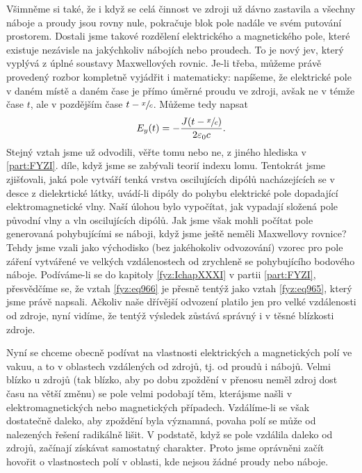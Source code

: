     Všimněme si také, že i když se celá činnost ve zdroji už dávno zastavila a všechny náboje a
    proudy jsou rovny nule, pokračuje blok pole nadále ve svém putování prostorem. Dostali jsme
    takové rozdělení elektrického a magnetického pole, které existuje nezávisle na jakýchkoliv
    nábojích nebo proudech. To je nový jev, který vyplývá z úplné soustavy Maxwellových rovnic.
    Je-li třeba, můžeme právě provedený rozbor kompletně vyjádřit i matematicky: napíšeme, že
    elektrické pole v daném místě a daném čase je přímo úměrné proudu ve zdroji, avšak ne v témže
    čase \(t\), ale v pozdějším čase \(t-\sfrac{x}{c}\). Můžeme tedy napsat
    \begin{equation}\label{fyz:eq965}
      E_y(t)=-\dfrac{J(t-\sfrac{x}{c})}{2\varepsilon_0 c}.
    \end{equation}
    Stejný vztah jsme už odvodili, věřte tomu nebo ne, z jiného hlediska v \ref{part:FYZI}. díle,
    když jsme se zabývali teorií indexu lomu. Tentokrát jsme zjišťovali, jaká pole vytváří tenká
    vrstva oscilujících dipólů nacházejících se v desce z dielekrtické látky, uvádí-li dipóly do
    pohybu elektrické pole dopadající elektromagnetické vlny. Naší úlohou bylo vypočítat, jak
    vypadají složená pole původní vlny a vln oscilujících dipólů. Jak jsme však mohli počítat pole
    generovaná pohybujícími se náboji, když jsme ještě neměli Maxwellovy rovnice? Tehdy jsme vzali
    jako východisko (bez jakéhokoliv odvozování) vzorec pro pole záření vytvářené ve velkých
    vzdálenostech od zrychleně se pohybujícího bodového náboje. Podíváme-li se do kapitoly
    \ref{fyz:IchapXXXI} v partii \ref{part:FYZI}, přesvědčíme se, že vztah \eqref{fyz:eq966} je
    přesně tentýž jako vztah \eqref{fyz:eq965}, který jsme právě napsali. Ačkoliv naše dřívější
    odvození platilo jen pro velké vzdálenosti od zdroje, nyní vidíme, že tentýž výsledek zůstává
    správný i v těsné blízkosti zdroje.

    Nyní se chceme obecně podívat na vlastnosti elektrických a magnetických polí ve vakuu, a to v
    oblastech vzdálených od zdrojů, tj. od proudů i nábojů. Velmi blízko u zdrojů (tak blízko, aby
    po dobu zpoždění v přenosu neměl zdroj dost času na větší změnu) se pole velmi podobají těm,
    kterájsme našli v elektromagnetických nebo magnetických případech. Vzdálíme-li se však
    dostatečně daleko, aby zpoždění byla významná, povaha polí se může od nalezených řešení
    radikálně lišit. V podstatě, když se pole vzdálila daleko od zdrojů, začínají získávat
    samostatný charakter. Proto jsme oprávněni začít hovořit o vlastnostech polí v oblasti, kde
    nejsou žádné proudy nebo náboje.
    
